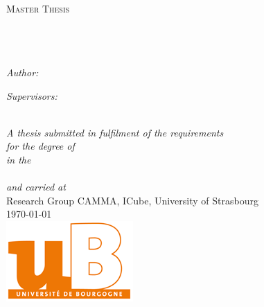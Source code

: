 \documentclass[twoside,a4,12p]{Thesis}
\begin{document}
\begin{titlepage}
\begin{center}

\textsc{\LARGE \univname}\\[1.5cm] %
\textsc{\Large Master Thesis}\\[0.5cm] %

\HRule \\[0.4cm] %
{\huge \bfseries \ttitle}\\[0.4cm] %
\HRule \\[1.5cm] %
 
\begin{minipage}{0.4\textwidth}
\begin{flushleft} \large
\emph{Author:}\\
\href{http://emreozanalkan.github.io}{\authornames} %
\end{flushleft}
\end{minipage}
\begin{minipage}{0.4\textwidth}
\begin{flushright} \large
\emph{Supervisors:} \\
\href{http://camma.u-strasbg.fr}{\supname} %
\end{flushright}
\end{minipage}\\[2cm]
 
\large \textit{A thesis submitted in fulfilment of the requirements\\ for the degree of \degreename}\\[0.3cm] %
\textit{in the}\\[0.4cm]
\deptname \\[0.4cm] %
\textit{and carried at}\\[0.4cm]
Research Group CAMMA, ICube, University of Strasbourg\\[0.7cm]
 
{\large \today}\\[0.7cm] %
\includegraphics[scale=0.4]{Figures/universiteBourgogneLogo} %
\vfill
\end{center}

\end{titlepage}
\end{document}
